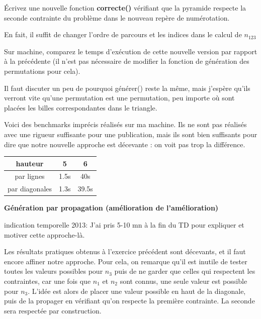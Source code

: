 \documentclass[10pt]{article}\usepackage[correction,nu]{esial}
\begin{document}
\Question %
Écrivez une nouvelle fonction \textbf{correcte()} vérifiant que la pyramide
respecte la seconde contrainte du problème dans le nouveau repère de numérotation.

\begin{Reponse}
  En fait, il suffit de changer l'ordre de parcours et les indices dans le calcul de $n_{123}$
  
  \newcommand*\FancyVerbStartString{// BEGIN CORRECTE}
  \newcommand*\FancyVerbStopString{// END CORRECTE}
\end{Reponse}

\begin{Question}
  Sur machine, comparez le temps d'exécution de cette nouvelle version par
  rapport à la précédente (il n'est pas nécessaire de modifier la fonction de
  génération des permutations pour cela).
\end{Question}

\begin{Reponse}
  Il faut discuter un peu de pourquoi générer() reste la même, mais j'espère
  qu'ils verront vite qu'une permutation est une permutation, peu importe où
  sont placées les billes correspondantes dans le triangle.
  
  Voici des benchmarks imprécis réalisés sur ma machine. Ils ne sont pas
  réalisés avec une rigueur suffisante pour une publication, mais ils sont bien
  suffisants pour dire que notre nouvelle approche est décevante : on voit pas
  trop la différence.

  \begin{tabular}{|c|c|c|}\hline
    hauteur       &5&6\\\hline
    par lignes    &1.5s&40s\\\hline
    par diagonales&1.3s&39.5s\\\hline
  \end{tabular}
\end{Reponse}

\begin{Exercice}\textbf{Génération par propagation (amélioration de l'amélioration)}
\end{Exercice}

\begin{Reponse}
  indication temporelle 2013: J'ai pris 5-10 mn à la fin du TD pour expliquer et
  motiver cette approche-là.
\end{Reponse}

\noindent Les résultats pratiques obtenus à l'exercice précédent sont décevants,
et il faut encore affiner notre approche. Pour cela, on remarque qu'il est
inutile de tester toutes les valeurs possibles pour $n_3$ puis de ne garder que
celles qui respectent les contraintes, car une fois que $n_1$ et $n_2$ sont
connus, une seule valeur est possible pour $n_3$. L'idée est alors de placer
une valeur possible en haut de la diagonale, puis de la propager en vérifiant
qu'on respecte la première contrainte. La seconde sera respectée par construction.
\end{document}
